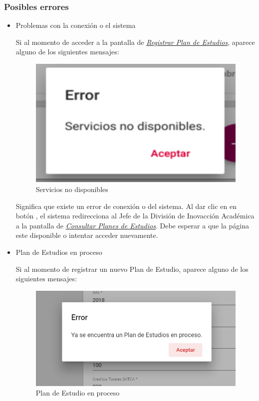 \subsubsection{Posibles errores}
\begin{itemize}

	\item Problemas con la conexión o el sistema

	Si al momento de acceder a la pantalla de \hyperlink{registrarPE}{\textit{Registrar Plan de Estudios}}, aparece alguno de los siguientes mensajes:
		\begin{figure}[H]
		\centering
		\hypertarget{error}{\includegraphics[width=0.7\linewidth]{images/SP4-GPE/error}}
		\caption{Servicios no disponibles}
		\label{error}
		\end{figure}


	Significa que existe un error de conexión o del sistema. Al dar clic en en botón , el sistema redirecciona al Jefe de la División de Inovacción Académica a la pantalla de \hyperlink{consultarPE}{\textit{Consultar Planes de Estudios}}. Debe esperar a que la página este disponible o intentar acceder nuevamente.
	\newpage
	\item Plan de Estudios en proceso

	Si al momento de registrar un nuevo Plan de Estudio, aparece alguno de los siguientes mensajes:
	\begin{figure}[H]
		\centering
		\hypertarget{error1}{\includegraphics[width=0.7\linewidth]{images/SP4-GPE/error1}}
		\caption{Plan de Estudio en proceso}
		\label{error1}
	\end{figure}



\end{itemize}
